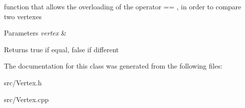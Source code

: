 function that allows the overloading of the operator == , in order to compare two vertexes 


\begin{DoxyParams}{Parameters}
{\em vertex} & \\
\hline
\end{DoxyParams}
\begin{DoxyReturn}{Returns}
true if equal, false if different 
\end{DoxyReturn}


The documentation for this class was generated from the following files\+:\begin{DoxyCompactItemize}
\item 
src/Vertex.\+h\item 
src/Vertex.\+cpp\end{DoxyCompactItemize}
